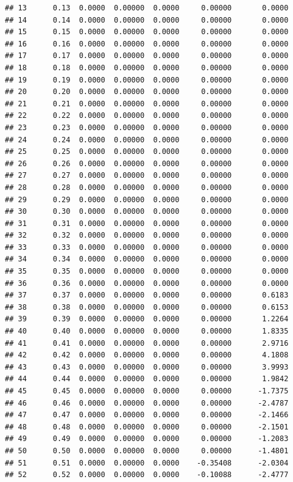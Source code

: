 \documentclass{article}\usepackage[]{graphicx}\usepackage[]{color}
\makeatletter
\newenvironment{kframe}{%
 \def\at@end@of@kframe{}%
 \ifinner\ifhmode%
  \def\at@end@of@kframe{\end{minipage}}%
  \begin{minipage}{\columnwidth}%
 \fi\fi%
 \def\FrameCommand##1{\hskip\@totalleftmargin \hskip-\fboxsep
 \colorbox{shadecolor}{##1}\hskip-\fboxsep
     \hskip-\linewidth \hskip-\@totalleftmargin \hskip\columnwidth}%
 \MakeFramed {\advance\hsize-\width
   \@totalleftmargin\z@ \linewidth\hsize
   \@setminipage}}%
 {\par\unskip\endMakeFramed%
 \at@end@of@kframe}
\newenvironment{knitrout}{}{} %
\makeatother
\begin{document}
\begin{knitrout}
\begin{kframe}
\begin{verbatim}
## 13      0.13  0.0000  0.00000  0.0000     0.00000       0.0000
## 14      0.14  0.0000  0.00000  0.0000     0.00000       0.0000
## 15      0.15  0.0000  0.00000  0.0000     0.00000       0.0000
## 16      0.16  0.0000  0.00000  0.0000     0.00000       0.0000
## 17      0.17  0.0000  0.00000  0.0000     0.00000       0.0000
## 18      0.18  0.0000  0.00000  0.0000     0.00000       0.0000
## 19      0.19  0.0000  0.00000  0.0000     0.00000       0.0000
## 20      0.20  0.0000  0.00000  0.0000     0.00000       0.0000
## 21      0.21  0.0000  0.00000  0.0000     0.00000       0.0000
## 22      0.22  0.0000  0.00000  0.0000     0.00000       0.0000
## 23      0.23  0.0000  0.00000  0.0000     0.00000       0.0000
## 24      0.24  0.0000  0.00000  0.0000     0.00000       0.0000
## 25      0.25  0.0000  0.00000  0.0000     0.00000       0.0000
## 26      0.26  0.0000  0.00000  0.0000     0.00000       0.0000
## 27      0.27  0.0000  0.00000  0.0000     0.00000       0.0000
## 28      0.28  0.0000  0.00000  0.0000     0.00000       0.0000
## 29      0.29  0.0000  0.00000  0.0000     0.00000       0.0000
## 30      0.30  0.0000  0.00000  0.0000     0.00000       0.0000
## 31      0.31  0.0000  0.00000  0.0000     0.00000       0.0000
## 32      0.32  0.0000  0.00000  0.0000     0.00000       0.0000
## 33      0.33  0.0000  0.00000  0.0000     0.00000       0.0000
## 34      0.34  0.0000  0.00000  0.0000     0.00000       0.0000
## 35      0.35  0.0000  0.00000  0.0000     0.00000       0.0000
## 36      0.36  0.0000  0.00000  0.0000     0.00000       0.0000
## 37      0.37  0.0000  0.00000  0.0000     0.00000       0.6183
## 38      0.38  0.0000  0.00000  0.0000     0.00000       0.6153
## 39      0.39  0.0000  0.00000  0.0000     0.00000       1.2264
## 40      0.40  0.0000  0.00000  0.0000     0.00000       1.8335
## 41      0.41  0.0000  0.00000  0.0000     0.00000       2.9716
## 42      0.42  0.0000  0.00000  0.0000     0.00000       4.1808
## 43      0.43  0.0000  0.00000  0.0000     0.00000       3.9993
## 44      0.44  0.0000  0.00000  0.0000     0.00000       1.9842
## 45      0.45  0.0000  0.00000  0.0000     0.00000      -1.7375
## 46      0.46  0.0000  0.00000  0.0000     0.00000      -2.4787
## 47      0.47  0.0000  0.00000  0.0000     0.00000      -2.1466
## 48      0.48  0.0000  0.00000  0.0000     0.00000      -2.1501
## 49      0.49  0.0000  0.00000  0.0000     0.00000      -1.2083
## 50      0.50  0.0000  0.00000  0.0000     0.00000      -1.4801
## 51      0.51  0.0000  0.00000  0.0000    -0.35408      -2.0304
## 52      0.52  0.0000  0.00000  0.0000    -0.10088      -2.4777

\end{verbatim}
\end{kframe}
\end{knitrout}
\end{document}

